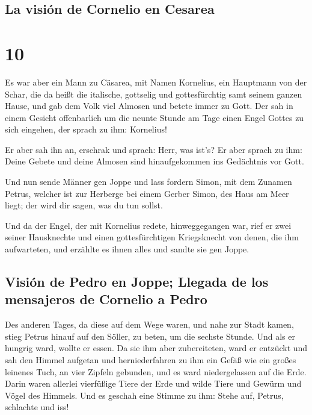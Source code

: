 \hypertarget{la-visiuxf3n-de-cornelio-en-cesarea}{%
\subsection{La visión de Cornelio en
Cesarea}\label{la-visiuxf3n-de-cornelio-en-cesarea}}

\hypertarget{section-9}{%
\section{10}\label{section-9}}

 Es war aber ein Mann zu Cäsarea, mit Namen Kornelius, ein
Hauptmann von der Schar, die da heißt die italische, 
gottselig und gottesfürchtig samt seinem ganzen Hause, und gab dem Volk
viel Almosen und betete immer zu Gott.  Der sah in einem
Gesicht offenbarlich um die neunte Stunde am Tage einen Engel Gottes zu
sich eingehen, der sprach zu ihm: Kornelius!

 Er aber sah ihn an, erschrak und sprach: Herr, was ist's?
Er aber sprach zu ihm: Deine Gebete und deine Almosen sind
hinaufgekommen ins Gedächtnis vor Gott.

 Und nun sende Männer gen Joppe und lass fordern Simon,
mit dem Zunamen Petrus,  welcher ist zur Herberge bei
einem Gerber Simon, des Haus am Meer liegt; der wird dir sagen, was du
tun sollst.

 Und da der Engel, der mit Kornelius redete,
hinweggegangen war, rief er zwei seiner Hausknechte und einen
gottesfürchtigen Kriegsknecht von denen, die ihm aufwarteten,
 und erzählte es ihnen alles und sandte sie gen Joppe.

\hypertarget{visiuxf3n-de-pedro-en-joppe-llegada-de-los-mensajeros-de-cornelio-a-pedro}{%
\subsection{Visión de Pedro en Joppe; Llegada de los mensajeros de
Cornelio a
Pedro}\label{visiuxf3n-de-pedro-en-joppe-llegada-de-los-mensajeros-de-cornelio-a-pedro}}

 Des anderen Tages, da diese auf dem Wege waren, und nahe
zur Stadt kamen, stieg Petrus hinauf auf den Söller, zu beten, um die
sechste Stunde.  Und als er hungrig ward, wollte er
essen. Da sie ihm aber zubereiteten, ward er entzückt 
und sah den Himmel aufgetan und herniederfahren zu ihm ein Gefäß wie ein
großes leinenes Tuch, an vier Zipfeln gebunden, und es ward
niedergelassen auf die Erde.  Darin waren allerlei
vierfüßige Tiere der Erde und wilde Tiere und Gewürm und Vögel des
Himmels.  Und es geschah eine Stimme zu ihm: Stehe auf,
Petrus, schlachte und iss!

